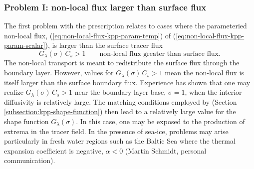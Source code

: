 \subsubsection{Problem I: non-local flux larger than surface flux}
\label{subsubsection:non-local-flux-too-large}

The first problem with the \cite{LargeKPP} prescription relates to
cases where the parameteried non-local flux,
(\ref{eq:non-local-flux-kpp-param-temp}) of
(\ref{eq:non-local-flux-kpp-param-scalar}), is larger than the surface
tracer flux
\begin{equation}
   G_{\lambda}(\sigma) \, C_{s} > 1\qquad \mbox{non-local flux greater than surface flux.}
\end{equation}
The non-local transport is meant to redistribute the surface flux
through the boundary layer.  However, values for $G_{\lambda}(\sigma)
\, C_{s} > 1$ mean the non-local flux is itself larger than the
surface boundary flux.  Experience has shown that one may realize
$G_{\lambda}(\sigma) \, C_{s} > 1$ near the boundary layer base,
$\sigma=1$, when the interior diffusivity is relatively large.  The
matching conditions employed by \cite{LargeKPP} (Section
\ref{subsection:kpp-shape-function}) then lead to a relatively large
value for the shape function $G_{\lambda}(\sigma)$.  In this case, one
may be exposed to the production of extrema in the tracer field.  In
the presence of sea-ice, problems may arise particularly in fresh
water regions such as the Baltic Sea where the thermal expansion
coefficient is negative, $\alpha < 0$ (Martin Schmidt, personal
communication).

